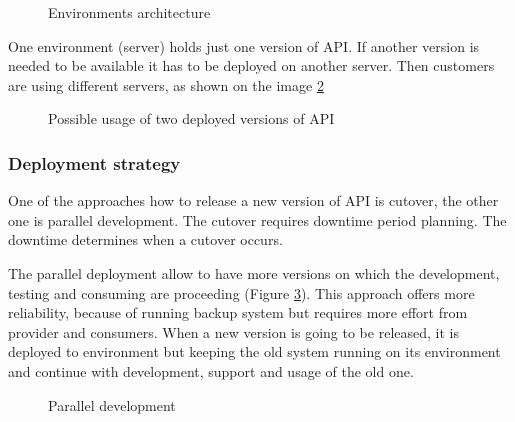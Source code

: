 \begin{figure}[htp] 
\caption{Environments architecture}
\label{fig:environments}
\end{figure} 

One environment (server) holds just one version of API. If another version is needed to be available it has to be deployed on another server. Then customers are using different servers, as shown on the image \ref{fig:consumer-server}

\begin{figure}[htp] 
\caption{Possible usage of two deployed versions of API}
\label{fig:consumer-server}
\end{figure} 

\subsubsection{Deployment strategy}
One of the approaches how to release a new version of API is cutover, the other one is parallel development. The cutover requires downtime period planning. The downtime determines when a cutover occurs. 

The parallel deployment allow to have more versions on which the development, testing and consuming are proceeding (Figure \ref{fig:parellel-development}). This approach offers more reliability, because of running backup system but requires more effort from provider and consumers. When a new version is going to be released, it is deployed to environment but keeping the old system running on its environment and continue with development, support and usage of the old one. 

\begin{figure}[htp] 
\caption{Parallel development}
\label{fig:parellel-development}
\end{figure} 

